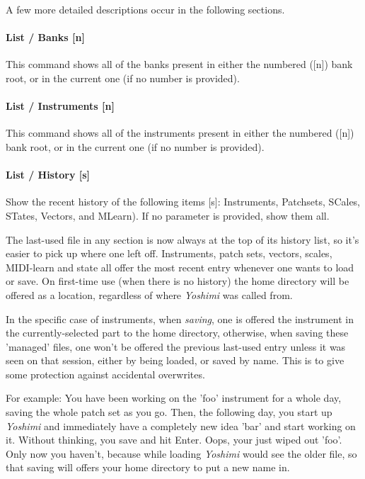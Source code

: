 A few more detailed descriptions occur in the following sections.

\paragraph{List / Banks [n]}
\label{paragraph:command_line_list_banks}

   This command shows all of the banks present in either the numbered ([n])
   bank root, or in the current one (if no number is provided).

\paragraph{List / Instruments [n]}
\label{paragraph:command_line_list_instruments}

   This command shows all of the instruments present in either the numbered
   ([n]) bank root, or in the current one (if no number is provided).

\paragraph{List / History [s]}
\label{paragraph:command_line_list_history}

   Show the recent history of the following items [s]:
   Instruments, Patchsets, SCales, STates, Vectors, and MLearn).
   If no parameter is provided, show them all.

   The last-used file in any section is now always at the top of its history list,
   so it's easier to pick up where one left off.
   Instruments, patch sets, vectors, scales, MIDI-learn and state all offer the
   most recent entry whenever one wants to load or save.  On first-time use (when
   there is no history) the home directory will be offered as a location,
   regardless of where \textsl{Yoshimi} was called from.

   In the specific case of instruments, when \textsl{saving},
   one is offered the instrument in the currently-selected part to the home
   directory, otherwise, when saving these 'managed' files,
   one won't be offered the previous last-used entry unless it was seen on that
   session, either by being loaded, or saved by name. This is to give some
   protection against accidental overwrites.

   For example:
   You have been working on the 'foo' instrument
   for a whole day, saving the whole patch set as you
   go. Then, the following day, you start up \textsl{Yoshimi}
   and immediately have a completely
   new idea 'bar' and start working on it. Without thinking, you save and hit
   Enter. Oops, your just wiped out 'foo'.
   Only now you haven't, because while loading \textsl{Yoshimi}
   would see the older file, so that saving
   will offers your home directory to put a new name in.

